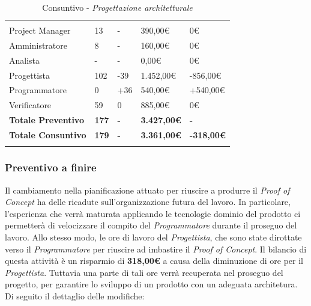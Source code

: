 \begin{table}[H]
	\centering
	\begin{tabular}{|p{3.8cm}|C{2.6cm}|C{2.9cm}|C{2.7cm}|C{3.3cm}|}
		
		 & & & & \\
		Project Manager  & 13 & - & 390,00\euro & 0\euro \\
		\hline
		Amministratore& 8 & - & 160,00\euro & 0\euro \\
		\hline
		Analista      & - & - & 0,00\euro & 0\euro \\
		\hline
		Progettista   & 102  & -39 & 1.452,00\euro & -856,00\euro \\
		\hline
		Programmatore & 0  & +36 & 540,00\euro & +540,00\euro \\
		\hline
		Verificatore  & 59 & 0 & 885,00\euro & 0\euro \\
		\textbf{Totale Preventivo} & \textbf{177} & \textbf{-} & \textbf{3.427,00\euro} & \textbf{-}\\
		\textbf{Totale Consuntivo} & \textbf{179} & \textbf{-} & \textbf{3.361,00\euro} & \textbf{-318,00\euro}\\
	\end{tabular}
	\caption{Consuntivo - \textit{Progettazione architetturale}}
	
\end{table}
\subsubsection{Preventivo a finire}
Il cambiamento nella pianificazione attuato per riuscire a produrre il \textit{Proof of Concept} ha delle ricadute sull'organizzazione futura del lavoro. In particolare, l'esperienza che verrà maturata applicando le tecnologie dominio del prodotto ci permetterà di velocizzare il compito del \textit{Programmatore} durante il proseguo del lavoro. Allo stesso modo, le ore di lavoro del \textit{Progettista}, che sono state dirottate verso il \textit{Programmatore} per riuscire ad imbastire il \textit{Proof of Concept}. Il bilancio di questa attività è un risparmio di \textbf{318,00\euro} a causa della diminuzione di ore per il \textit{Progettista}. Tuttavia una parte di tali ore verrà recuperata nel proseguo del progetto, per garantire lo sviluppo di un prodotto con un adeguata architetura.
Di seguito il dettaglio delle modifiche:


